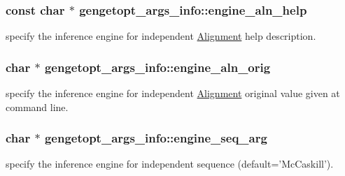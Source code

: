 \hypertarget{structgengetopt__args__info_ac82fc1aba0c9785c9484b68abe875fba}{
\subsubsection[{engine\+\_\+aln\+\_\+help}]{\setlength{\rightskip}{0pt plus 5cm}const char $\ast$ gengetopt\+\_\+args\+\_\+info\+::engine\+\_\+aln\+\_\+help}}\label{structgengetopt__args__info_ac82fc1aba0c9785c9484b68abe875fba}


specify the inference engine for independent \hyperlink{class_alignment}{Alignment} help description. 

\hypertarget{structgengetopt__args__info_aefc2d0fce93eea31fcad7240368fc488}{
\subsubsection[{engine\+\_\+aln\+\_\+orig}]{\setlength{\rightskip}{0pt plus 5cm}char $\ast$ gengetopt\+\_\+args\+\_\+info\+::engine\+\_\+aln\+\_\+orig}}\label{structgengetopt__args__info_aefc2d0fce93eea31fcad7240368fc488}


specify the inference engine for independent \hyperlink{class_alignment}{Alignment} original value given at command line. 

\hypertarget{structgengetopt__args__info_a1a3510547af7d7dd9e238d147fb3bbf7}{
\subsubsection[{engine\+\_\+seq\+\_\+arg}]{\setlength{\rightskip}{0pt plus 5cm}char $\ast$ gengetopt\+\_\+args\+\_\+info\+::engine\+\_\+seq\+\_\+arg}}\label{structgengetopt__args__info_a1a3510547af7d7dd9e238d147fb3bbf7}


specify the inference engine for independent sequence (default='Mc\+Caskill'). 

